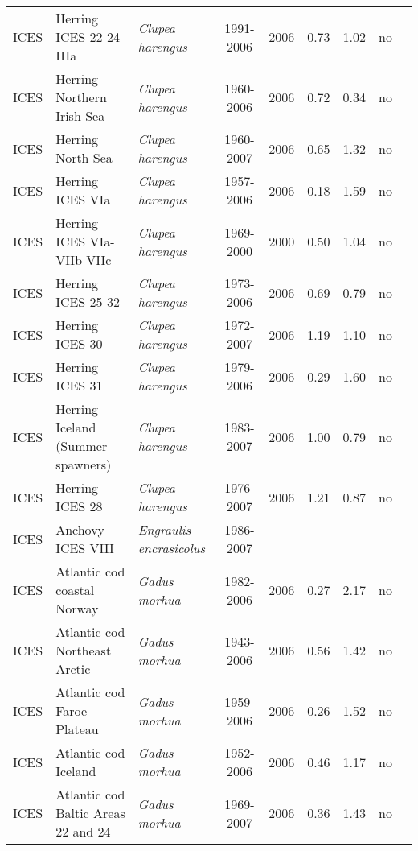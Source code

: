 \begin{longtable}{p{1.8cm}p{4cm}p{4cm}ccccp{1.9cm}c}
  ICES & Herring ICES 22-24-IIIa & \textit{Clupea harengus} & 1991-2006 & 2006 & 0.73 & 1.02 & no & \cite{ICES-HAWG-2007.pdf} \\ 
  ICES & Herring Northern Irish Sea & \textit{Clupea harengus} & 1960-2006 & 2006 & 0.72 & 0.34 & no & \cite{ICES-HAWG-2007.pdf} \\ 
  ICES & Herring North Sea & \textit{Clupea harengus} & 1960-2007 & 2006 & 0.65 & 1.32 & no & \cite{ICES-HAWG-2007.pdf} \\ 
  ICES & Herring ICES VIa & \textit{Clupea harengus} & 1957-2006 & 2006 & 0.18 & 1.59 & no & \cite{ICES-HAWG-2007.pdf} \\ 
  ICES & Herring ICES VIa-VIIb-VIIc & \textit{Clupea harengus} & 1969-2000 & 2000 & 0.50 & 1.04 & no & \cite{ICES-HAWG-2007.pdf} \\ 
  ICES & Herring ICES 25-32 & \textit{Clupea harengus} & 1973-2006 & 2006 & 0.69 & 0.79 & no & \cite{ICES-WGBFAS-2007.pdf} \\ 
  ICES & Herring ICES 30 & \textit{Clupea harengus} & 1972-2007 & 2006 & 1.19 & 1.10 & no & \cite{ICES-WGBFAS-2007.pdf} \\ 
  ICES & Herring ICES 31 & \textit{Clupea harengus} & 1979-2006 & 2006 & 0.29 & 1.60 & no & \cite{ICES-WGBFAS-2007.pdf} \\ 
  ICES & Herring Iceland (Summer spawners) & \textit{Clupea harengus} & 1983-2007 & 2006 & 1.00 & 0.79 & no & \cite{ICES-NWWG-2007.pdf} \\ 
  ICES & Herring ICES 28 & \textit{Clupea harengus} & 1976-2007 & 2006 & 1.21 & 0.87 & no & \cite{ICES-WGBFAS-2007.pdf} \\ 
  ICES & Anchovy ICES VIII & \textit{Engraulis encrasicolus} & 1986-2007 &  &  &  &  & \cite{ICES-WGMHSA007.pdf} \\ 
  ICES & Atlantic cod coastal Norway & \textit{Gadus morhua} & 1982-2006 & 2006 & 0.27 & 2.17 & no & \cite{ICES-AFWG-2007.pdf} \\ 
  ICES & Atlantic cod Northeast Arctic & \textit{Gadus morhua} & 1943-2006 & 2006 & 0.56 & 1.42 & no & \cite{AFWG-NEAR-Gadusmorhua-2007.pdf} \\ 
  ICES & Atlantic cod Faroe Plateau & \textit{Gadus morhua} & 1959-2006 & 2006 & 0.26 & 1.52 & no & \cite{ICES-NWWG-2007.pdf} \\ 
  ICES & Atlantic cod Iceland & \textit{Gadus morhua} & 1952-2006 & 2006 & 0.46 & 1.17 & no & \cite{ICES-NWWG-2007.pdf} \\ 
  ICES & Atlantic cod Baltic Areas 22 and 24 & \textit{Gadus morhua} & 1969-2007 & 2006 & 0.36 & 1.43 & no & \cite{ICES-WGBFAS-2007.pdf} \\ 

\end{longtable}
